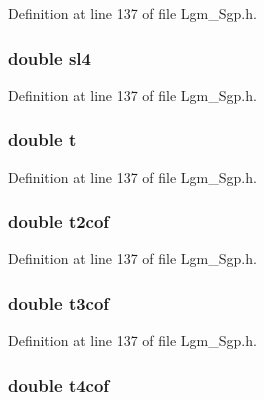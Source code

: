 Definition at line 137 of file Lgm\_\-Sgp.h.\hypertarget{struct___sgp_info_234f391445ad2c9894442de5280d0559}{
\subsubsection[{sl4}]{\setlength{\rightskip}{0pt plus 5cm}double {\bf sl4}}}
\label{struct___sgp_info_234f391445ad2c9894442de5280d0559}




Definition at line 137 of file Lgm\_\-Sgp.h.\hypertarget{struct___sgp_info_87accd1af8e0aff4b818d891374f7cec}{
\subsubsection[{t}]{\setlength{\rightskip}{0pt plus 5cm}double {\bf t}}}
\label{struct___sgp_info_87accd1af8e0aff4b818d891374f7cec}




Definition at line 137 of file Lgm\_\-Sgp.h.\hypertarget{struct___sgp_info_a92271ca6d86502933389f47a9202ab6}{
\subsubsection[{t2cof}]{\setlength{\rightskip}{0pt plus 5cm}double {\bf t2cof}}}
\label{struct___sgp_info_a92271ca6d86502933389f47a9202ab6}




Definition at line 137 of file Lgm\_\-Sgp.h.\hypertarget{struct___sgp_info_6ead2ed42d4de4759c2a773cbc10d36c}{
\subsubsection[{t3cof}]{\setlength{\rightskip}{0pt plus 5cm}double {\bf t3cof}}}
\label{struct___sgp_info_6ead2ed42d4de4759c2a773cbc10d36c}




Definition at line 137 of file Lgm\_\-Sgp.h.\hypertarget{struct___sgp_info_9fba2bddd10102492866a46693318781}{
\subsubsection[{t4cof}]{\setlength{\rightskip}{0pt plus 5cm}double {\bf t4cof}}}
\label{struct___sgp_info_9fba2bddd10102492866a46693318781}




